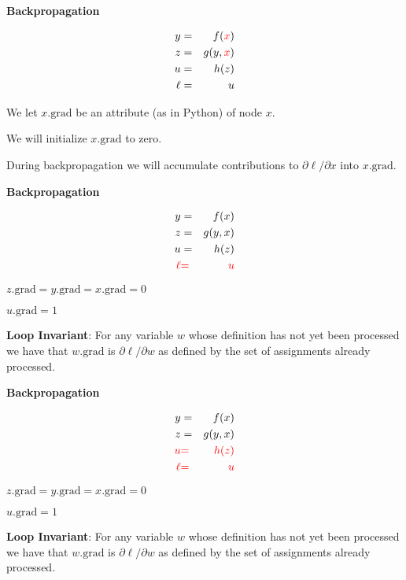 \documentclass[landscape]{article}
\newcommand{\anaslide}[1]{
  \vfill
  \centerline{\Large\thepage}
  \eject \centerline{\bf #1}}
\newcommand{\grad}{\mathrm{grad}}
\begin{document}
{\anaslide{Backpropagation}
\vspace{-3ex}
\begin{eqnarray*}
  y & = & f({\color{red} x}) \\
  z & = & g(y,{\color{red} x}) \\
  u & = & h(z) \\
  \ell &  = &  u
\end{eqnarray*}

\medskip
We let {\color{red} $x.\grad$} be an attribute (as in Python) of node {\color{red} $x$}.

\bigskip
\bigskip
We will initialize {\color{red} $x.\mathrm{grad}$} to zero.

\bigskip
\bigskip
During backpropagation we will accumulate contributions to {\color{red} ${\partial \ell}/{\partial x}$} into {\color{red} $x.\grad$}.


\anaslide{Backpropagation}
\vspace{-3ex}
\begin{eqnarray*}
  y & = & f(x) \\
  z & = & g(y,x) \\
  u & = & h(z) \\
  {\color{red} \ell} &  {\color{red} =} & {\color{red}  u}
\end{eqnarray*}


\medskip
$z.\grad = y.\grad = x.\grad = 0$

\medskip
$u.\grad = 1$

\medskip
{\bf Loop Invariant}: For any variable $w$ whose definition has not yet been processed we have that $w.\grad$ is $\partial \ell/\partial w$ as defined by the set of assignments already processed.

\anaslide{Backpropagation}
\vspace{-3ex}
\begin{eqnarray*}
  y & = & f(x) \\
  z & = & g(y,x) \\
  {\color{red} u} & {\color{red} =} & {\color{red} h(z)} \\
  {\color{red} \ell} & {\color{red}  =} &  {\color{red} u}
\end{eqnarray*}

\medskip
$z.\grad = y.\grad = x.\grad = 0$

\medskip
$u.\grad = 1$

\medskip
{\bf Loop Invariant}: For any variable $w$ whose definition has not yet been processed we have that $w.\grad$ is $\partial \ell/\partial w$ as defined by the set of assignments already processed.

}
\end{document}
